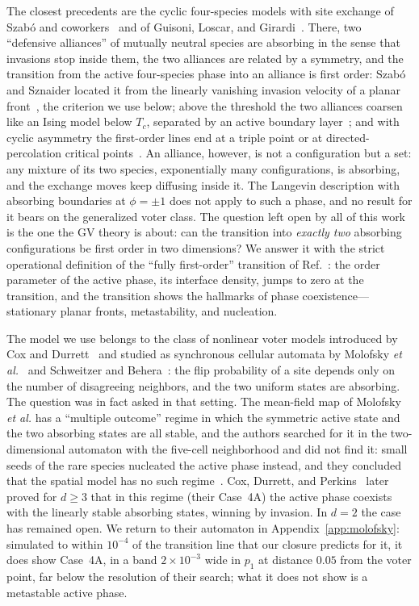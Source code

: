 \documentclass[pre,twocolumn,superscriptaddress,showpacs,floatfix]{revtex4-2}
\begin{document}
The closest precedents are the cyclic four-species models with site exchange of Szab\'o and
coworkers~\cite{szabo2004,szabo2005,szabo2007,szabo2007b,szabo2008} and of Guisoni, Loscar, and
Girardi~\cite{guisoni2013}. There, two ``defensive alliances'' of mutually neutral species are
absorbing in the sense that invasions stop inside them, the two alliances are related by a
symmetry, and the transition from the active four-species phase into an alliance is first order:
Szab\'o and Sznaider located it from the linearly vanishing invasion velocity of a planar
front~\cite{szabo2004}, the criterion we use below; above the threshold the two alliances coarsen
like an Ising model below $T_c$, separated by an active boundary layer~\cite{szabo2007}; and
with cyclic asymmetry the first-order lines end at a triple point or at directed-percolation
critical points~\cite{guisoni2013}. An alliance, however, is not a configuration but a set: any
mixture of its two species, exponentially many configurations, is absorbing, and the exchange
moves keep diffusing inside it. The Langevin description with absorbing boundaries at
$\phi = \pm1$ does not apply to such a phase, and no result for it bears on the generalized voter
class. The question left open by all of this work is the one the GV theory is about: can the
transition into \emph{exactly two} absorbing configurations be first order in two dimensions? We
answer it with the strict operational definition of the ``fully first-order'' transition of
Ref.~\cite{alhammal2005}: the order parameter of the active phase, its interface density, jumps
to zero at the transition, and the transition shows the hallmarks of phase
coexistence---stationary planar fronts, metastability, and nucleation.

The model we use belongs to the class of nonlinear voter models introduced by Cox and
Durrett~\cite{cox1991} and studied as synchronous cellular automata by Molofsky \emph{et
al.}~\cite{molofsky1999} and Schweitzer and Behera~\cite{schweitzer2009}: the flip probability
of a site depends only on the number of disagreeing neighbors, and the two uniform states are
absorbing. The question was in fact asked in that setting. The mean-field map of Molofsky
\emph{et al.} has a ``multiple outcome'' regime in which the symmetric active state and the two
absorbing states are all stable, and the authors searched for it in the two-dimensional automaton
with the five-cell neighborhood and did not find it: small seeds of the rare species nucleated the
active phase instead, and they concluded that the spatial model has no such
regime~\cite{molofsky1999}. Cox, Durrett, and Perkins~\cite{cox2013} later proved for $d\ge3$
that in this regime (their Case~4A) the active phase coexists with the linearly stable absorbing
states, winning by invasion. In $d = 2$ the case has remained open. We return to their
automaton in Appendix~\ref{app:molofsky}: simulated to within $10^{-4}$ of the transition line
that our closure predicts for it, it does show Case~4A, in a band $2\times10^{-3}$ wide in $p_1$ at
distance $0.05$ from the voter point, far below the resolution of their search; what it does not
show is a metastable active phase.
\end{document}
